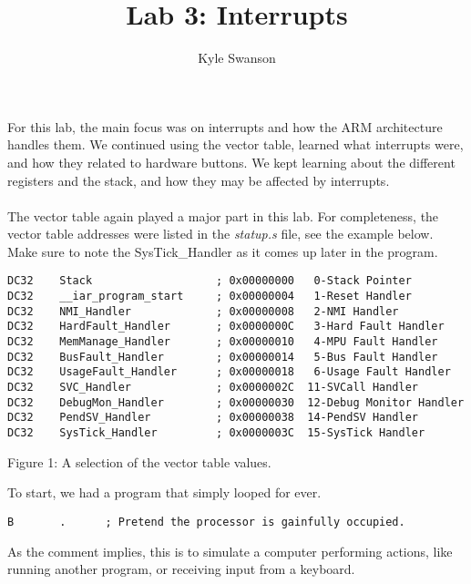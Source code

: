 \documentclass[12pt,a4paper]{report}
\author{Kyle Swanson}
\title{Lab 3: Interrupts }
\begin{document}
\maketitle

\paragraph{}
For this lab, the main focus was on interrupts and how the ARM architecture handles them. We continued using the vector table, learned what interrupts were, and how they related to hardware buttons. We kept learning about the different registers and the stack, and how they may be affected by interrupts. 

\paragraph{}
The vector table again played a major part in this lab. For completeness, the vector table addresses were listed in the \textit{statup.s} file, see the example below. Make sure to note the SysTick\_Handler as it comes up later in the program. 

\medskip

\lstset{language=[x86masm]Assembler}
\begin{lstlisting}
DC32    Stack                   ; 0x00000000   0-Stack Pointer
DC32    __iar_program_start     ; 0x00000004   1-Reset Handler
DC32    NMI_Handler             ; 0x00000008   2-NMI Handler
DC32    HardFault_Handler       ; 0x0000000C   3-Hard Fault Handler
DC32    MemManage_Handler       ; 0x00000010   4-MPU Fault Handler
DC32    BusFault_Handler        ; 0x00000014   5-Bus Fault Handler
DC32    UsageFault_Handler      ; 0x00000018   6-Usage Fault Handler
DC32    SVC_Handler             ; 0x0000002C  11-SVCall Handler
DC32    DebugMon_Handler        ; 0x00000030  12-Debug Monitor Handler
DC32    PendSV_Handler          ; 0x00000038  14-PendSV Handler
DC32    SysTick_Handler         ; 0x0000003C  15-SysTick Handler

\end{lstlisting}	
\begin{center}
\small{Figure 1: A selection of the vector table values.}
\end{center}
\medskip
\medskip
\medskip
To start, we had a program that simply looped for ever. 
\lstset{language=[x86masm]Assembler}
\begin{lstlisting}
B       .      ; Pretend the processor is gainfully occupied.
\end{lstlisting}	
As the comment implies, this is to simulate a computer performing actions, like running another program, or receiving input from a keyboard. 
\end{document}
